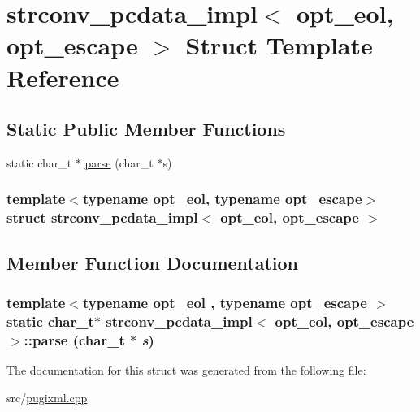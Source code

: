 \hypertarget{structstrconv__pcdata__impl}{
\section{strconv\_\-pcdata\_\-impl$<$ opt\_\-eol, opt\_\-escape $>$ Struct Template Reference}
\label{structstrconv__pcdata__impl}
}
\subsection*{Static Public Member Functions}
\begin{DoxyCompactItemize}
\item 
static char\_\-t $\ast$ \hyperlink{structstrconv__pcdata__impl_a0aa794c648c72338d92b86c95c681b32}{parse} (char\_\-t $\ast$s)
\end{DoxyCompactItemize}
\subsubsection*{template$<$typename opt\_\-eol, typename opt\_\-escape$>$ struct strconv\_\-pcdata\_\-impl$<$ opt\_\-eol, opt\_\-escape $>$}



\subsection{Member Function Documentation}
\hypertarget{structstrconv__pcdata__impl_a0aa794c648c72338d92b86c95c681b32}{
\subsubsection[{parse}]{\setlength{\rightskip}{0pt plus 5cm}template$<$typename opt\_\-eol , typename opt\_\-escape $>$ static char\_\-t$\ast$ {\bf strconv\_\-pcdata\_\-impl}$<$ opt\_\-eol, opt\_\-escape $>$::parse (char\_\-t $\ast$ {\em s})}}
\label{structstrconv__pcdata__impl_a0aa794c648c72338d92b86c95c681b32}


The documentation for this struct was generated from the following file:\begin{DoxyCompactItemize}
\item 
src/\hyperlink{pugixml_8cpp}{pugixml.cpp}\end{DoxyCompactItemize}
